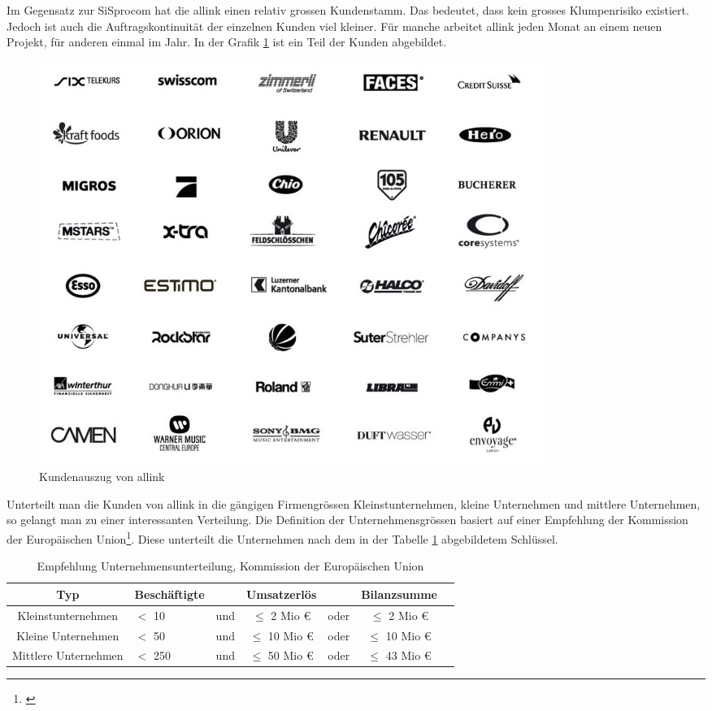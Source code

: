 Im Gegensatz zur SiSprocom hat die allink einen relativ grossen Kundenstamm.
Das bedeutet, dass kein grosses Klumpenrisiko existiert. Jedoch ist auch
die Auftragskontinuität der einzelnen Kunden viel kleiner. Für manche arbeitet
allink jeden Monat an einem neuen Projekt, für anderen einmal im Jahr.
In der Grafik \ref{pic:kundenauszug} ist ein Teil der Kunden abgebildet.

\begin{figure}[htbp]
\begin{center}
\includegraphics[width=0.8\textwidth,angle=0]{./bilder/analyse/kundenauszug.jpg}
\caption{Kundenauszug von allink}
\label{pic:kundenauszug}
\end{center}
\end{figure}

Unterteilt man die Kunden von allink in die gängigen Firmengrössen Kleinstunternehmen,
kleine Unternehmen und mittlere Unternehmen, so gelangt man zu einer interessanten 
Verteilung. Die Definition der Unternehmensgrössen basiert auf einer Empfehlung
der Kommission der Europäischen Union\footnote{\citealp*[Vgl.][Anhang Art. 2]{eu_komission_unternehmen}}.
Diese unterteilt die Unternehmen nach dem in der Tabelle \ref{tab:eu_unterteilung} 
abgebildetem Schlüssel.

\begin{table}[h]
\begin{center}
    \begin{tabular}{clccccc}
        \toprule \textbf{Typ} & \textbf{Beschäftigte} & & \textbf{Umsatzerlös} & & \textbf{Bilanzsumme} \\
        \midrule Kleinstunternehmen & $<$ 10 & und & $\leq$ 2 Mio \euro & oder & $\leq$ 2 Mio \euro \\
        \midrule Kleine Unternehmen & $<$ 50 & und & $\leq$ 10 Mio \euro & oder & $\leq$ 10 Mio \euro \\
        \midrule Mittlere Unternehmen & $<$ 250 & und & $\leq$ 50 Mio \euro & oder & $\leq$ 43 Mio \euro \\
        \bottomrule
    \end{tabular}
    \caption{Empfehlung Unternehmensunterteilung, Kommission der Europäischen Union}
    \label{tab:eu_unterteilung}
\end{center}
\end{table}

